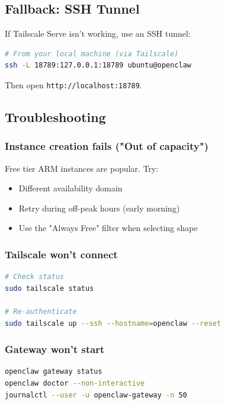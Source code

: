 \hrulefill


\subsection{Fallback: SSH Tunnel}


If Tailscale Serve isn't working, use an SSH tunnel:

\begin{lstlisting}[language=bash]
# From your local machine (via Tailscale)
ssh -L 18789:127.0.0.1:18789 ubuntu@openclaw
\end{lstlisting}


Then open \texttt{http://localhost:18789}.

\hrulefill


\subsection{Troubleshooting}


\subsubsection{Instance creation fails ("Out of capacity")}


Free tier ARM instances are popular. Try:

\begin{itemize}
  \item Different availability domain
  \item Retry during off-peak hours (early morning)
  \item Use the "Always Free" filter when selecting shape
\end{itemize}


\subsubsection{Tailscale won't connect}


\begin{lstlisting}[language=bash]
# Check status
sudo tailscale status

# Re-authenticate
sudo tailscale up --ssh --hostname=openclaw --reset
\end{lstlisting}


\subsubsection{Gateway won't start}


\begin{lstlisting}[language=bash]
openclaw gateway status
openclaw doctor --non-interactive
journalctl --user -u openclaw-gateway -n 50
\end{lstlisting}


